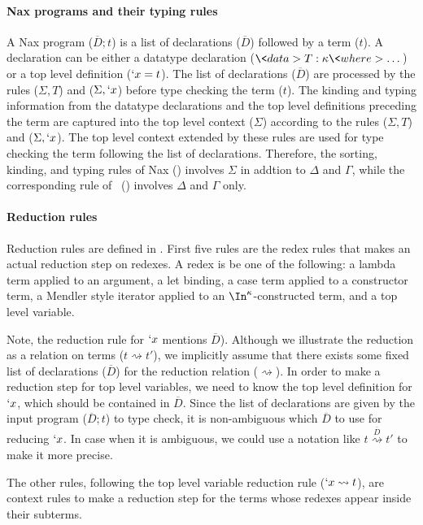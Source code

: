 \paragraph{Nax programs and their typing rules}
A Nax program ($\overline{D};t$) is a list of declarations ($\overline{D}$)
followed by a term ($t$). A declaration can be either a datatype declaration
($\<data> T : \kappa \<where> \dots$) or a top level definition ($`x=t$).
The list of declarations ($\overline{D}$) are processed by the rules
($\Sigma,T$) and ($\Sigma,`x$) before type checking the term ($t$).
The kinding and typing information from the datatype declarations and
the top level definitions preceding the term are captured into
the top level context ($\Sigma$) according to the rules ($\Sigma,T$)
and ($\Sigma,`x$). The top level context extended by these rules are
used for type checking the term following the list of declarations.
Therefore, the sorting, kinding, and typing rules of Nax ()
involves $\Sigma$ in addtion to $\Delta$ and $\Gamma$, while
the corresponding rule of \Fi\ () involves $\Delta$ and $\Gamma$
only.

\paragraph{Reduction rules}
Reduction rules are defined in . First five rules are
the redex rules that makes an actual reduction step on redexes.
A redex is be one of the following: a lambda term applied to an argument,
a let binding, a case term applied to a constructor term,
a Mendler style iterator applied to an $\In^\kappa$-constructed term,
and a top level variable.

Note, the reduction rule for $`x$ mentions $\overline{D}$).
Although we illustrate the reduction as a relation on terms
($t\rightsquigarrow t'$), we implicitly assume that there exists
some fixed list of declarations ($\overline{D}$)
for the reduction relation ($\rightsquigarrow$).
In order to make a reduction step for top level variables,
we need to know the top level definition for $`x$, which
should be contained in $\overline{D}$. Since the list of declarations
are given by the input program ($\overline{D};t$) to type check,
it is non-ambiguous which $\overline{D}$ to use for reducing $`x$.
In case when it is ambiguous, we could use a notation like
$t\stackrel{\overline{D}}\rightsquigarrow t'$ to make it more precise.

The other rules, following the top level variable reduction rule
($`x\rightsquigarrow t$), are context rules to make a reduction step
for the terms whose redexes appear inside their subterms.

